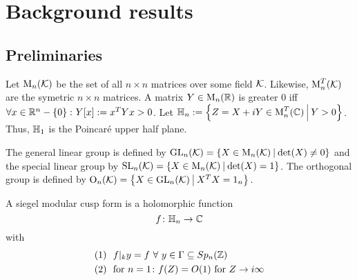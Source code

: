 
\section{Background results}

\subsection{Preliminaries}

Let $\operatorname{M}_n(\mathcal{K})$ be the set of all $n \times n$ matrices over some field $\mathcal{K}$. Likewise, $\operatorname{M}_n^T(\mathcal{K})$ are the symetric $n \times n$ matrices. A matrix $Y \in \operatorname{M}_n(\mathbb{R})$ is greater $0$ iff $\forall x \in \R^n - \Set{0} \colon Y[x] := x^T Y x > 0$. Let $\HalfPlane_n := \Set{Z = X + iY \in \M_n^T(\C)}{Y > 0}$. Thus, $\mathbb{H}_1$ is the Poincaré upper half plane.

The general linear group is defined by $\GL_n(\K) = \Set{X \in \M_n(\K)}{\det(X) \neq 0}$ and the special linear group by $\SL_n(\K) = \Set{X \in \M_n(\K)}{\det(X) = 1}$. The orthogonal group is defined by $\Orth_n(\K) = \Set{X \in \GL_n(\K)}{X^T X = 1_n}$.

A siegel modular cusp form is a holomorphic function
\[ f \colon \mathbb{H}_n \rightarrow \mathbb{C} \]
with
\begin{align*}
(1) \ \ & f |_k y = f \ \forall \ y \in \Gamma \subseteq Sp_n(\mathbb{Z}) \\
(2) \ \ & \text{for } n = 1 \colon f(Z) = O(1) \text{ for } Z \rightarrow i \infty
\end{align*}

